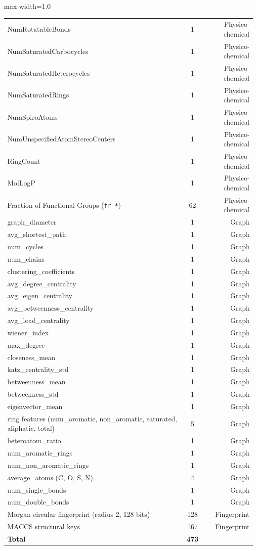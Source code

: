 \documentclass[9pt,a4paper]{article}
\begin{document}
\begin{table}[h]
\begin{adjustbox}{max width=1.0\linewidth}
\begin{tabular}{|l|c|r|}
NumRotatableBonds & 1 & Physico-chemical \\
NumSaturatedCarbocycles & 1 & Physico-chemical \\
NumSaturatedHeterocycles & 1 & Physico-chemical \\
NumSaturatedRings & 1 & Physico-chemical \\
NumSpiroAtoms & 1 & Physico-chemical \\
NumUnspecifiedAtomStereoCenters & 1 & Physico-chemical \\
RingCount & 1 & Physico-chemical \\
MolLogP & 1 & Physico-chemical \\
Fraction of Functional Groups (\texttt{fr\_*}) & 62 & Physico-chemical \\
\midrule
graph\_diameter & 1 & Graph \\
avg\_shortest\_path & 1 & Graph \\
num\_cycles & 1 & Graph \\
num\_chains & 1 & Graph \\
clustering\_coefficients & 1 & Graph \\
avg\_degree\_centrality & 1 & Graph \\
avg\_eigen\_centrality & 1 & Graph \\
avg\_betweenness\_centrality & 1 & Graph \\
avg\_load\_centrality & 1 & Graph \\
wiener\_index & 1 & Graph \\
max\_degree & 1 & Graph \\
closeness\_mean & 1 & Graph \\
katz\_centrality\_std & 1 & Graph \\
betweenness\_mean & 1 & Graph \\
betweenness\_std & 1 & Graph \\
eigenvector\_mean & 1 & Graph \\
ring features (num\_aromatic, non\_aromatic, saturated, aliphatic, total) & 5 & Graph \\
heteroatom\_ratio & 1 & Graph \\
num\_aromatic\_rings & 1 & Graph \\
num\_non\_aromatic\_rings & 1 & Graph \\
average\_atoms (C, O, S, N) & 4 & Graph \\
num\_single\_bonds & 1 & Graph \\
num\_double\_bonds & 1 & Graph \\
\midrule
Morgan circular fingerprint (radius 2, 128 bits) & 128 & Fingerprint \\
MACCS structural keys & 167 & Fingerprint \\
\midrule
\textbf{Total} & \textbf{473} & \\
\bottomrule
\end{tabular}
\end{adjustbox}
\end{table}
\end{document}
